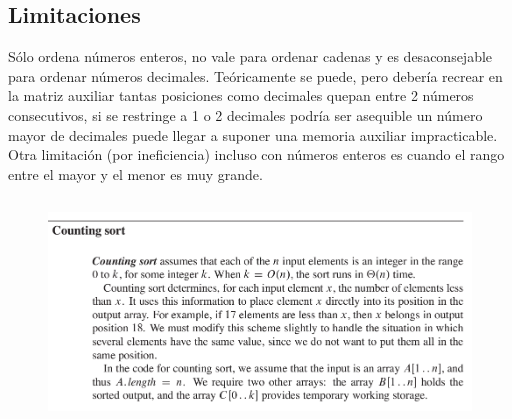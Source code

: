 \documentclass[a4paper]{article} %
\begin{document}
		\subsection*{Limitaciones}
		Sólo ordena números enteros, no vale para ordenar cadenas y es desaconsejable para ordenar números decimales. Teóricamente se puede, pero debería recrear en la matriz auxiliar tantas posiciones como decimales quepan entre 2 números consecutivos, si se restringe a 1 o 2 decimales podría ser asequible un número mayor de decimales puede llegar a suponer una memoria auxiliar impracticable.\\
		Otra limitación (por ineficiencia) incluso con números enteros es cuando el rango entre el mayor y el menor es muy grande. 

		\begin{figure}[ht]
			\begin{center}
				\includegraphics[width=\textwidth,height=60mm]{Imagenes/countingsort/counting01.png}				
			\end{center} 
		\end{figure}
		\afterpage{\newpage}
		\newpage
\end{document}
